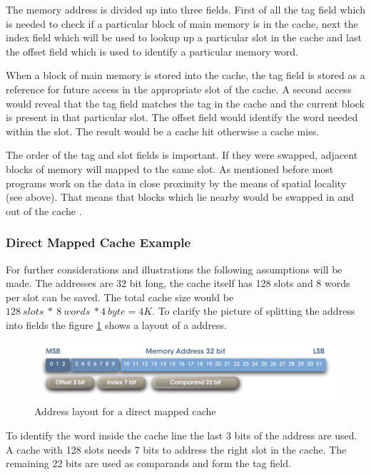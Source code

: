 \documentclass[DIV10, abstracton, openright, footsepline, headsepline, twoside, 9pt,
bigheadings]{scrreprt}
\begin{document}
The memory address is divided up into three fields. First of all the tag field
which is needed to check if a particular block of main memory is in the cache,
next the index field which will be used to lookup up a particular slot in the
cache and last the offset field which is used to identify a particular memory
word.

When a block of main memory is stored into the cache, the tag field is stored
as a reference for future access in the appropriate slot of the cache. A second
access would reveal that the tag field matches the tag in the cache and the
current block is present in that particular slot. The offset field would
identify the word needed within the slot. The result would be a cache hit
otherwise a cache miss.

The order of the tag and slot fields is important. If they were swapped,
adjacent blocks of memory will mapped to the same slot. As mentioned before
most programs work on the data in close proximity by the means of spatial
locality (see above). That means that blocks which lie nearby would
be swapped in and out of the cache \cite{Harman04}.

\subsubsection{Direct Mapped Cache Example}
For further considerations and illustrations the following assumptions will be
made. The addresses are 32 bit long, the cache itself has 128 slots and 8 words
per slot can be saved. The total cache size would be
$128\ slots\ *\ 8\ words\ * 4\ byte = 4K$.
To clarify the picture of splitting the address into fields the figure
\ref{fig:addsplit_dmc} shows a layout of a address.

\begin{figure}[H]
\centering
\includegraphics[width=\textwidth]{diagramme/addsplit_dmc}
\caption{Address layout for a direct mapped cache}
\label{fig:addsplit_dmc}
\end{figure}

To identify the word inside the cache line the last 3 bits of the address are
used. A cache with 128 slots needs 7 bits to address the right slot in the
cache. The remaining 22 bits are used as comparands and form the tag field.
\end{document}
